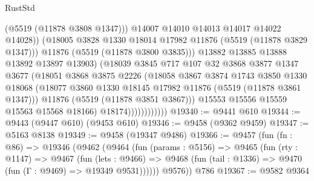 \begin{lexlean}{RustStd}
\begin{coremodule}
                                    (@5519 (@11878 @3808 @1347)))
                                  @14007
                                  @14010
                                  @14013
                                  @14017
                                  @14022
                                  @14028))
                              (@18005 @3828 @1330 @18014 @17982 @11876 (@5519 (@11878 @3829 @1347)))
                              @11876
                              (@5519 (@11878 @3800 @3835)))
                            @13882
                            @13885
                            @13888
                            @13892
                            @13897
                            @13903)
                          (@18039
                            @3845
                            @717
                            @107
                            @32
                            @3868
                            @3877
                            @1347
                            @3677
                            (@18051
                              @3868
                              @3875
                              @2226
                              (@18058
                                @3867
                                @3874
                                @1743
                                @3850
                                @1330
                                @18068
                                (@18077
                                  @3860
                                  @1330
                                  @18145
                                  @17982
                                  @11876
                                  (@5519 (@11878 @3861 @1347)))
                                @11876
                                (@5519 (@11878 @3851 @3867)))
                              @15553
                              @15556
                              @15559
                              @15563
                              @15568
                              @18166)
                            @18174))))))))))))
@19340 := @9441 @610
@19344 := @9443 (@9447 @610) (@9453 @610)
@19346 := @9458 (@9362 @9459)
@19347 := @5163 @8138
@19349 := @9458 (@19347 @9486)
@19366 := @9457
    (fun (fn : @86) =>
    @19346
      (@9462
        (@9464
          (fun (params : @5156) =>
          @9465
            (fun (rty : @1147) =>
            @9467
              (fun (lets : @9466) =>
              @9468 (fun (tail : @1336) => @9470 (fun (Γ : @9469) => @19349 @9531))))))
        @9576))
    @786
@19367 := @9582 @9364

\end{coremodule}
\end{lexlean}
